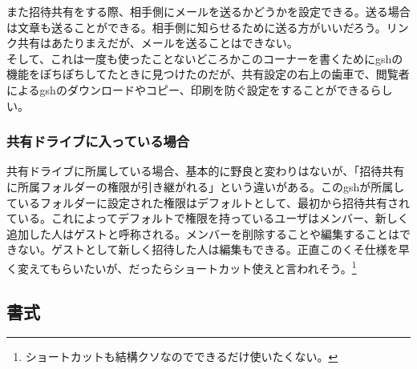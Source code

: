 \documentclass[dvipdfmx,jb5]{jreport}
\begin{document}
また招待共有をする際、相手側にメールを送るかどうかを設定できる。送る場合は文章も送ることができる。相手側に知らせるために送る方がいいだろう。リンク共有はあたりまえだが、メールを送ることはできない。
\\

そして、これは一度も使ったことないどころかこのコーナーを書くためにgshの機能をぽちぽちしてたときに見つけたのだが、共有設定の右上の歯車で、閲覧者によるgshのダウンロードやコピー、印刷を防ぐ設定をすることができるらしい。
\subsubsection{共有ドライブに入っている場合}
共有ドライブに所属している場合、基本的に野良と変わりはないが、「招待共有に所属フォルダーの権限が引き継がれる」という違いがある。このgshが所属しているフォルダーに設定された権限はデフォルトとして、最初から招待共有されている。これによってデフォルトで権限を持っているユーザはメンバー、新しく追加した人はゲストと呼称される。メンバーを削除することや編集することはできない。ゲストとして新しく招待した人は編集もできる。正直このくそ仕様を早く変えてもらいたいが、だったらショートカット使えと言われそう。\footnote{ショートカットも結構クソなのでできるだけ使いたくない。}

\subsection{書式}
\end{document}
